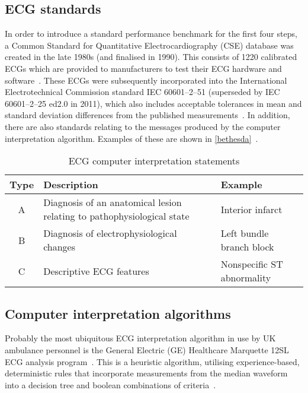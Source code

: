 \subsection{ECG standards}
\label{ecgstandards}

In order to introduce a standard performance benchmark for the first four steps, a Common Standard for Quantitative Electrocardiography (CSE) database was created in the late 1980s (and finalised in 1990). This consists of 1220 calibrated ECGs which are provided to manufacturers to test their ECG hardware and software~\citep{willems_comparison_1991,willems_diagnostic_1991}. These ECGs were subsequently incorporated into the International Electrotechnical Commission standard IEC 60601--2--51 (superseded by IEC 60601--2--25 ed2.0 in 2011), which also includes acceptable tolerances in mean and standard deviation differences from the published measurements~\citep{international_electrotechnical_commission_medical_2011}. In addition, there are also standards relating to the messages produced by the computer interpretation algorithm. Examples of these are shown in \autoref{bethesda}~\citep{rautaharju_task_1978}.

\begin{table}[htbp]
\begin{minipage}{\linewidth}
\setlength{\tymax}{0.5\linewidth}
\centering
\small
\caption{ECG computer interpretation statements}
\label{bethesda}
\begin{tabulary}{\textwidth}{@{}CLL@{}} \toprule
\textbf{Type}&\textbf{Description}&\textbf{Example}\\
\midrule
A&Diagnosis of an anatomical lesion relating to pathophysiological state&Interior infarct\\
B&Diagnosis of electrophysiological changes&Left bundle branch block\\
C&Descriptive ECG features&Nonspecific ST abnormality\\

\bottomrule

\end{tabulary}
\end{minipage}
\end{table}


\subsection{Computer interpretation algorithms}
\label{computerinterpretationalgorithms}

Probably the most ubiquitous ECG interpretation algorithm in use by UK ambulance personnel is the General Electric (GE) Healthcare Marquette 12SL ECG analysis program~\citep{ge_healthcare_marquette_2010}. This is a heuristic algorithm, utilising experience-based, deterministic rules that incorporate measurements from the median waveform into a decision tree and boolean combinations of criteria~\citep{kligfield_recommendations_2007}.

